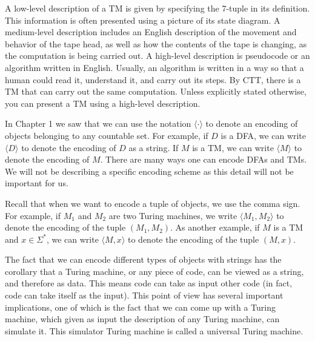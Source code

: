\begin{note} \label{note:Low-level-medium-level-high-level-descriptions-of-TMs}
A low-level description of a TM is given by specifying the 7-tuple in its definition. This information is often presented using a picture of its state diagram. A medium-level description includes an English description of the movement and behavior of the tape head, as well as how the contents of the tape is changing, as the computation is being carried out. A high-level description is pseudocode or an algorithm written in English. Usually, an algorithm is written in a way so that a human could read it, understand it, and carry out its steps. By CTT, there is a TM that can carry out the same computation. Unless explicitly stated otherwise, you can present a TM using a high-level description.
\end{note}


\begin{note} \label{note:Encodings-of-machines}
In Chapter 1 we saw that we can use the notation $\langle \cdot \rangle$ to denote an encoding of objects belonging to any countable set. For example, if $D$ is a DFA, we can write $\langle D \rangle$ to denote the encoding of $D$ as a string. If $M$ is a TM, we can write $\langle M \rangle$ to denote the encoding of $M$. There are many ways one can encode DFAs and TMs. We will not be describing a specific encoding scheme as this detail will not be important for us.

Recall that when we want to encode a tuple of objects, we use the comma sign. For example, if $M_1$ and $M_2$ are two Turing machines, we write $\langle M_1,M_2 \rangle$ to denote the encoding of the tuple $(M_1,M_2)$. As another example, if $M$ is a TM and $x \in \Sigma^*$, we can write $\langle M,x \rangle$ to denote the encoding of the tuple $(M,x)$. 
\end{note}


\begin{important} \label{important:Code-is-data}
The fact that we can encode different types of objects with strings has the corollary that a Turing machine, or any piece of code, can be viewed as a string, and therefore as data. This means code can take as input other code (in fact, code can take itself as the input). This point of view has several important implications, one of which is the fact that we can come up with a Turing machine, which given as input the description of any Turing machine, can simulate it. This simulator Turing machine is called a universal Turing machine.
\end{important}


